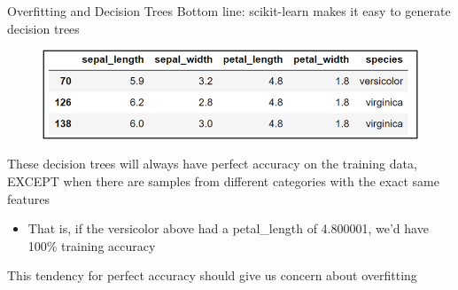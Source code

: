 \documentclass[aspectratio=169]{../latex_main/tntbeamer}  %
\begin{document}
	
	
	\begin{frame}{Overfitting and Decision Trees}
	    Bottom line: scikit-learn makes it easy to generate decision trees
	    \begin{figure}
	        \includegraphics[scale=.5]{Bild29}
	    \end{figure}
	    These decision trees will always have perfect accuracy on the training data, EXCEPT when there are samples from different categories with the exact same features
	    \begin{itemize}
	        \item That is, if the versicolor above had a petal\_length of 4.800001, we’d have 100\% training accuracy
	    \end{itemize}
	    
	    \bigskip
	    This tendency for perfect accuracy should give us concern about overfitting
	\end{frame}
\end{document}
